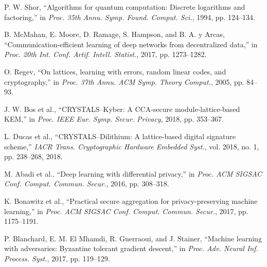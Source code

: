 \documentclass[journal,onecolumn]{IEEEtran}
\begin{document}
\begin{thebibliography}{99}

P. W. Shor, ``Algorithms for quantum computation: Discrete logarithms and factoring,'' in \textit{Proc. 35th Annu. Symp. Found. Comput. Sci.}, 1994, pp. 124--134.

B. McMahan, E. Moore, D. Ramage, S. Hampson, and B. A. y Arcas, ``Communication-efficient learning of deep networks from decentralized data,'' in \textit{Proc. 20th Int. Conf. Artif. Intell. Statist.}, 2017, pp. 1273--1282.

O. Regev, ``On lattices, learning with errors, random linear codes, and cryptography,'' in \textit{Proc. 37th Annu. ACM Symp. Theory Comput.}, 2005, pp. 84--93.

J. W. Bos et al., ``CRYSTALS--Kyber: A CCA-secure module-lattice-based KEM,'' in \textit{Proc. IEEE Eur. Symp. Secur. Privacy}, 2018, pp. 353--367.

L. Ducas et al., ``CRYSTALS--Dilithium: A lattice-based digital signature scheme,'' \textit{IACR Trans. Cryptographic Hardware Embedded Syst.}, vol. 2018, no. 1, pp. 238--268, 2018.

M. Abadi et al., ``Deep learning with differential privacy,'' in \textit{Proc. ACM SIGSAC Conf. Comput. Commun. Secur.}, 2016, pp. 308--318.

K. Bonawitz et al., ``Practical secure aggregation for privacy-preserving machine learning,'' in \textit{Proc. ACM SIGSAC Conf. Comput. Commun. Secur.}, 2017, pp. 1175--1191.

P. Blanchard, E. M. El Mhamdi, R. Guerraoui, and J. Stainer, ``Machine learning with adversaries: Byzantine tolerant gradient descent,'' in \textit{Proc. Adv. Neural Inf. Process. Syst.}, 2017, pp. 119--129.

\end{thebibliography}
\end{document}
